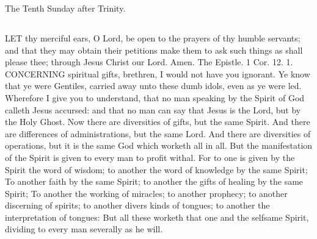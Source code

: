 The Tenth Sunday after Trinity.
\subsection{}
LET thy merciful ears, O Lord, be open to the prayers of thy humble servants; and that they may obtain their petitions make them to ask such things as shall please thee; through Jesus Christ our Lord. Amen.
The Epistle. 1 Cor. 12. 1.
CONCERNING spiritual gifts, brethren, I would not have you ignorant. Ye know that ye were Gentiles, carried away unto these dumb idols, even as ye were led. Wherefore I give you to understand, that no man speaking by the Spirit of God calleth Jesus accursed: and that no man can say that Jesus is the Lord, but by the Holy Ghost. Now there are diversities of gifts, but the same Spirit. And there are differences of administrations, but the same Lord. And there are diversities of operations, but it is the same God which worketh all in all. But the manifestation of the Spirit is given to every man to profit withal. For to one is given by the Spirit the word of wisdom; to another the word of knowledge by the same Spirit; To another faith by the same Spirit; to another the gifts of healing by the same Spirit; To another the working of miracles; to another prophecy; to another discerning of spirits; to another divers kinds of tongues; to another the interpretation of tongues: But all these worketh that one and the selfsame Spirit, dividing to every man severally as he will.

\subsection{}


